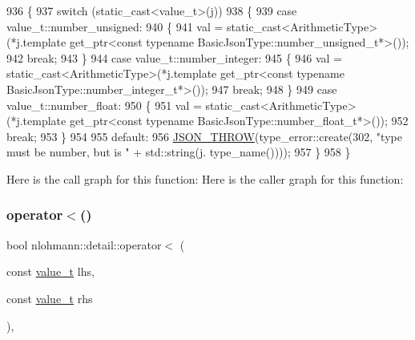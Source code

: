 \begin{DoxyCode}
936 \{
937     \textcolor{keywordflow}{switch} (static\_cast<value\_t>(j))
938     \{
939         \textcolor{keywordflow}{case} value\_t::number\_unsigned:
940         \{
941             val = \textcolor{keyword}{static\_cast<}ArithmeticType\textcolor{keyword}{>}(*j.template get\_ptr<const typename
       BasicJsonType::number\_unsigned\_t*>());
942             \textcolor{keywordflow}{break};
943         \}
944         \textcolor{keywordflow}{case} value\_t::number\_integer:
945         \{
946             val = \textcolor{keyword}{static\_cast<}ArithmeticType\textcolor{keyword}{>}(*j.template get\_ptr<const typename
       BasicJsonType::number\_integer\_t*>());
947             \textcolor{keywordflow}{break};
948         \}
949         \textcolor{keywordflow}{case} value\_t::number\_float:
950         \{
951             val = \textcolor{keyword}{static\_cast<}ArithmeticType\textcolor{keyword}{>}(*j.template get\_ptr<const typename
       BasicJsonType::number\_float\_t*>());
952             \textcolor{keywordflow}{break};
953         \}
954 
955         \textcolor{keywordflow}{default}:
956             \hyperlink{json_8hpp_a6c274f6db2e65c1b66c7d41b06ad690f}{JSON\_THROW}(type\_error::create(302, \textcolor{stringliteral}{"type must be number, but is "} + std::string(j.
      type\_name())));
957     \}
958 \}
\end{DoxyCode}
Here is the call graph for this function\+:
Here is the caller graph for this function\+:
\mbox{\label{namespacenlohmann_1_1detail_a09169efff3bd1771fff29bd92cea19e0}} 
\subsubsection{\texorpdfstring{operator$<$()}{operator<()}}
{\footnotesize\ttfamily bool nlohmann\+::detail\+::operator$<$ (\begin{DoxyParamCaption}\item[{const \hyperlink{namespacenlohmann_1_1detail_a1ed8fc6239da25abcaf681d30ace4985}{value\+\_\+t}}]{lhs,  }\item[{const \hyperlink{namespacenlohmann_1_1detail_a1ed8fc6239da25abcaf681d30ace4985}{value\+\_\+t}}]{rhs }\end{DoxyParamCaption})\hspace{0.3cm}{\ttfamily [inline]}, {\ttfamily [noexcept]}}



